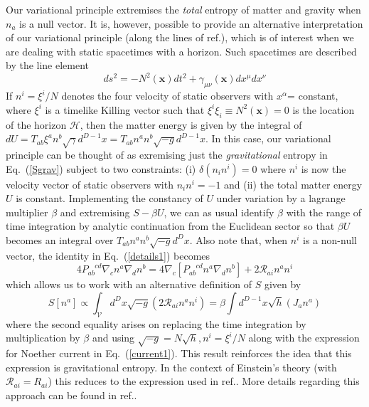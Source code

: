 \documentclass[12pt]{iopart}
\def\eq#1{{Eq.~(\ref{#1})}}
\newcommand{\Cal}[1]{\ensuremath{\mathcal{#1}}}
\newcommand{\ph}[1]{\phantom{#1}}
\newcommand{\D}{\ensuremath{\nabla}}
\begin{document}
Our variational principle  extremises the \textit{total} entropy of matter and gravity when $n_a$ is a null vector. It is, however, possible to provide an alternative interpretation of our variational principle (along the lines of ref.\cite{TPgravcqg04}), which is of interest  when we are dealing with static 
spacetimes with a horizon.  Such spacetimes are described by the line element
\begin{equation}
ds^2=-N^2(\mathbf{x})dt^2+\gamma_{\mu\nu}(\mathbf{x}) dx^\mu dx^\nu
\label{dssquare}
\end{equation} 
If  $n^i=\xi^i/N$ denotes the four velocity of static observers with $x^\alpha$= constant, where $\xi^i$ is a timelike Killing vector such that $\xi^i\xi_i\equiv N^2(\mathbf{x})=0$ is the location of the horizon $\mathcal{H}$, then the matter energy is given by the integral of $dU=T_{ab}\xi^an^b\sqrt{\gamma}d^{D-1}x
=T_{ab}n^an^b\sqrt{-g}d^{D-1}x$. 
In this case, our variational principle can be thought of  as exremising just the \textit{gravitational} entropy in \eq{Sgrav} subject to two constraints: (i) $\delta(n_in^i)=0$  where $n^i$ is now the  velocity vector of static observers with $n_in^i=-1$ and (ii) the total matter energy $U$ is constant.
Implementing the constancy of $U$ under variation by a lagrange multiplier $\beta$ and
extremising $S-\beta U$, we can as usual identify $\beta$ with the range of time integration by analytic continuation from the Euclidean sector so that $\beta U$ becomes an integral over
$T_{ab}n^an^b\sqrt{-g}d^Dx$.
Also note that, when $n^i$ is a non-null vector, the identity in \eq{details1} becomes
\begin{equation}
\label{details2}
4P_{ab}^{\ph{a}\ph{b}cd} \D_cn^a\D_dn^b=4\D_c[P_{ab}^{\ph{a}\ph{b}cd} n^a\D_dn^b]+2\mathcal{R}_{ai}n^an^i
\end{equation}
which
allows us to work with an alternative definition of $S$ given by
\begin{equation}
S[n^a]\propto\int_\Cal{V}{d^Dx\sqrt{-g}}
    \left( 2\mathcal{R}_{ai}n^an^i\right) 
    =\beta\int{d^{D-1}x\sqrt{h}}
    \left( J_an^a\right)
\label{altS}
\end{equation}
where the second equality arises on replacing the time integration by multiplication by $\beta$ and using $\sqrt{-g}=N\sqrt{h},n^i=\xi^i/N$ along with the expression for Noether current in \eq{current1}. This result reinforces the idea that this expression is gravitational entropy.
In the context of Einstein's theory (with $\mathcal{R}_{ai}=R_{ai}$) this reduces to the expression used in ref.\cite{TPgravcqg04}. More details regarding this approach can be found in ref.\cite{equipartition,TPgravcqg04}.
\end{document}
